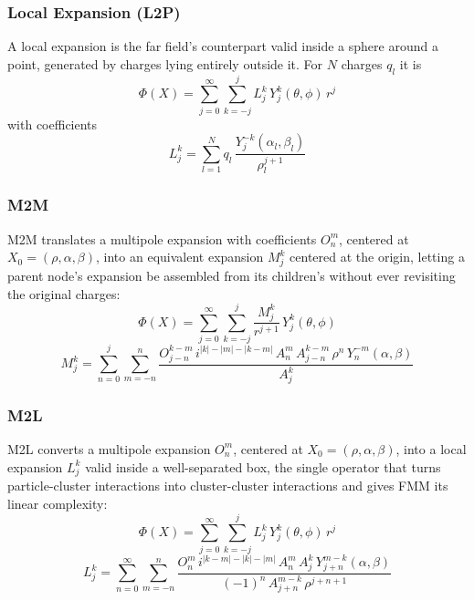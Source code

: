 \subsubsection{Local Expansion (L2P)}
A local expansion is the far field's counterpart valid inside a sphere around a point, generated by charges lying entirely outside it.
For $N$ charges $q_l$ it is
\begin{equation}
    \Phi(X) = \sum_{j=0}^{\infty}\sum_{k=-j}^{j} L_j^k \, Y_j^k(\theta,\phi) \, r^j
    \label{eq:local-expansion-potential}
\end{equation}
with coefficients
\begin{equation}
    L_j^k = \sum_{l=1}^{N} q_l \, \frac{Y_j^{-k}(\alpha_l,\beta_l)}{\rho_l^{j+1}}
    \label{eq:local-expansion-coeffs}
\end{equation}

\subsubsection{M2M}
M2M translates a multipole expansion with coefficients $O_n^m$, centered at $X_0=(\rho,\alpha,\beta)$, into an equivalent expansion $M_j^k$ centered at the origin, letting a parent node's expansion be assembled from its children's without ever revisiting the original charges:
\begin{equation}
    \Phi(X) = \sum_{j=0}^{\infty}\sum_{k=-j}^{j} \frac{M_j^k}{r^{j+1}} \, Y_j^k(\theta,\phi)
    \label{eq:m2m-potential}
\end{equation}
\begin{equation}
    M_j^k = \sum_{n=0}^{j}\sum_{m=-n}^{n} \frac{O_{j-n}^{k-m} \, i^{|k|-|m|-|k-m|} \, A_n^m \, A_{j-n}^{k-m} \, \rho^n \, Y_n^{-m}(\alpha,\beta)}{A_j^k}
    \label{eq:m2m-coeffs}
\end{equation}

\subsubsection{M2L}
M2L converts a multipole expansion $O_n^m$, centered at $X_0=(\rho,\alpha,\beta)$, into a local expansion $L_j^k$ valid inside a well-separated box, the single operator that turns particle-cluster interactions into cluster-cluster interactions and gives FMM its linear complexity:
\begin{equation}
    \Phi(X) = \sum_{j=0}^{\infty}\sum_{k=-j}^{j} L_j^k \, Y_j^k(\theta,\phi) \, r^j
    \label{eq:m2l-potential}
\end{equation}
\begin{equation}
    L_j^k = \sum_{n=0}^{\infty}\sum_{m=-n}^{n} \frac{O_n^m \, i^{|k-m|-|k|-|m|} \, A_n^m \, A_j^k \, Y_{j+n}^{m-k}(\alpha,\beta)}{(-1)^n \, A_{j+n}^{m-k} \, \rho^{j+n+1}}
    \label{eq:m2l-coeffs}
\end{equation}

